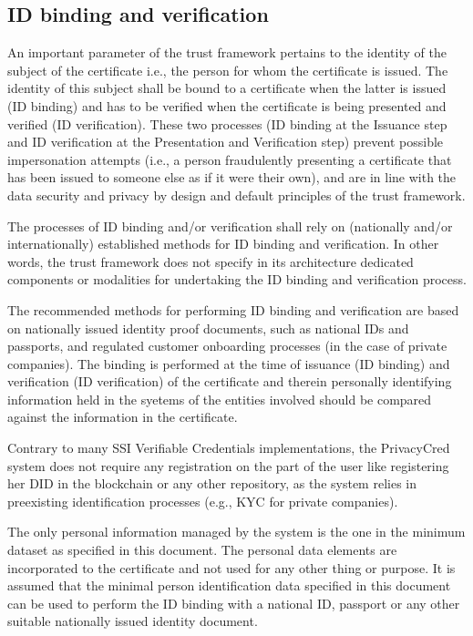 \documentclass[a4paper,12pt,english,openany]{sphinxmanual}
\begin{document}
\subsection{ID binding and verification}
\label{\detokenize{privacycred:id-binding-and-verification}}
\sphinxAtStartPar
An important parameter of the trust framework pertains to the identity of the subject of the certificate i.e., the person for whom the certificate is issued. The identity of this subject shall be bound to a certificate when the latter is issued (ID binding) and has to be verified when the certificate is being presented and verified (ID verification). These two processes (ID binding at the Issuance step and ID verification at the Presentation and Verification step) prevent possible impersonation attempts (i.e., a person fraudulently presenting a certificate that has been issued to someone else as if it were their own), and are in line with the data security and privacy by design and default principles of the trust framework.

\sphinxAtStartPar
The processes of ID binding and/or verification shall rely on (nationally and/or internationally) established methods for ID binding and verification. In other words, the trust framework does not specify in its architecture dedicated components or modalities for undertaking the ID binding and verification process.

\sphinxAtStartPar
The recommended methods for performing ID binding and verification are based on nationally issued identity proof documents, such as national IDs and passports, and regulated customer onboarding processes (in the case of private companies). The binding is performed at the time of issuance (ID binding) and verification (ID verification) of the certificate and therein personally identifying information held in the syetems of the entities involved should be compared against the information in the certificate.

\sphinxAtStartPar
Contrary to many SSI Verifiable Credentials implementations, the PrivacyCred system does not require any registration on the part of the user like registering her DID in the blockchain or any other repository, as the system relies in pre\sphinxhyphen{}existing identification processes (e.g., KYC for private companies).

\sphinxAtStartPar
The only personal information managed by the system is the one in the minimum dataset as specified
in this document. The personal data elements are incorporated to the certificate and not used for
any other thing or purpose. It is assumed that the minimal person identification data specified in
this document can be used to perform the ID binding with a national ID, passport or any other
suitable nationally issued identity document.
\end{document}
